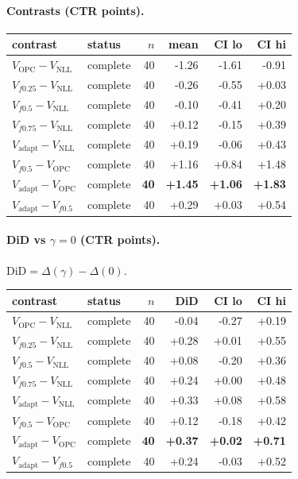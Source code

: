 \documentclass[10pt,a4paper]{article}
\begin{document}
\paragraph{Contrasts (CTR points).}
{\centering\small\begin{tabular}{llrrrr}
\toprule contrast & status & $n$ & mean & CI lo & CI hi \\
\midrule
$V_{\mathrm{OPC}}-V_{\mathrm{NLL}}$ & complete & 40 & -1.26 & -1.61 & -0.91 \\
$V_{f0.25}-V_{\mathrm{NLL}}$ & complete & 40 & -0.26 & -0.55 & +0.03 \\
$V_{f0.5}-V_{\mathrm{NLL}}$ & complete & 40 & -0.10 & -0.41 & +0.20 \\
$V_{f0.75}-V_{\mathrm{NLL}}$ & complete & 40 & +0.12 & -0.15 & +0.39 \\
$V_{\mathrm{adapt}}-V_{\mathrm{NLL}}$ & complete & 40 & +0.19 & -0.06 & +0.43 \\
$V_{f0.5}-V_{\mathrm{OPC}}$ & complete & 40 & +1.16 & +0.84 & +1.48 \\
\textbf{$V_{\mathrm{adapt}}-V_{\mathrm{OPC}}$} & complete & \textbf{40} & \textbf{+1.45} & \textbf{+1.06} & \textbf{+1.83} \\
$V_{\mathrm{adapt}}-V_{f0.5}$ & complete & 40 & +0.29 & +0.03 & +0.54 \\
\bottomrule\end{tabular}\par}
\paragraph{DiD vs $\gamma=0$ (CTR points).} $\mathrm{DiD}=\Delta(\gamma)-\Delta(0)$.
{\centering\small\begin{tabular}{llrrrr}
\toprule contrast & status & $n$ & DiD & CI lo & CI hi \\
\midrule
$V_{\mathrm{OPC}}-V_{\mathrm{NLL}}$ & complete & 40 & -0.04 & -0.27 & +0.19 \\
$V_{f0.25}-V_{\mathrm{NLL}}$ & complete & 40 & +0.28 & +0.01 & +0.55 \\
$V_{f0.5}-V_{\mathrm{NLL}}$ & complete & 40 & +0.08 & -0.20 & +0.36 \\
$V_{f0.75}-V_{\mathrm{NLL}}$ & complete & 40 & +0.24 & +0.00 & +0.48 \\
$V_{\mathrm{adapt}}-V_{\mathrm{NLL}}$ & complete & 40 & +0.33 & +0.08 & +0.58 \\
$V_{f0.5}-V_{\mathrm{OPC}}$ & complete & 40 & +0.12 & -0.18 & +0.42 \\
\textbf{$V_{\mathrm{adapt}}-V_{\mathrm{OPC}}$} & complete & \textbf{40} & \textbf{+0.37} & \textbf{+0.02} & \textbf{+0.71} \\
$V_{\mathrm{adapt}}-V_{f0.5}$ & complete & 40 & +0.24 & -0.03 & +0.52 \\
\bottomrule\end{tabular}\par}
\bigskip
\end{document}
